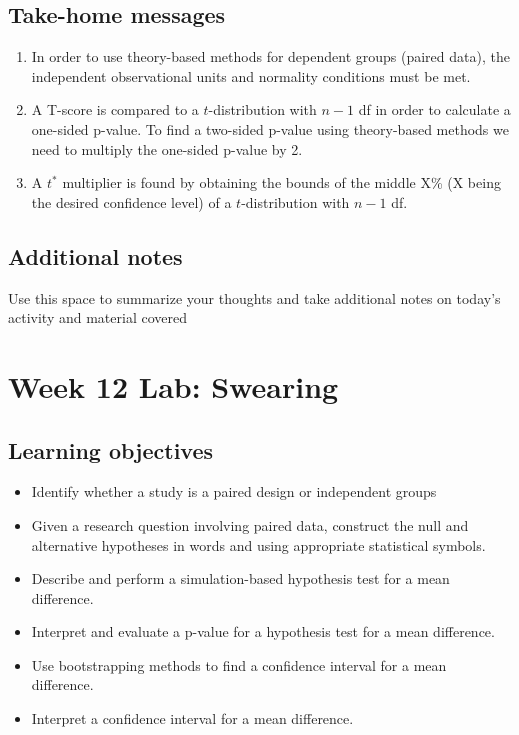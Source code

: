 \documentclass[
]{report}
\begin{document}
\hypertarget{take-home-messages-19}{%
\subsection{Take-home messages}\label{take-home-messages-19}}

\begin{enumerate}
\def\labelenumi{\arabic{enumi}.}
\item
  In order to use theory-based methods for dependent groups (paired data), the independent observational units and normality conditions must be met.
\item
  A T-score is compared to a \(t\)-distribution with \(n - 1\) df in order to calculate a one-sided p-value. To find a two-sided p-value using theory-based methods we need to multiply the one-sided p-value by 2.
\item
  A \(t^*\) multiplier is found by obtaining the bounds of the middle X\% (X being the desired confidence level) of a \(t\)-distribution with \(n - 1\) df.
\end{enumerate}

\hypertarget{additional-notes-19}{%
\subsection{Additional notes}\label{additional-notes-19}}

Use this space to summarize your thoughts and take additional notes on today's activity and material covered

\newpage

\hypertarget{week-12-lab-swearing}{%
\section{Week 12 Lab: Swearing}\label{week-12-lab-swearing}}


\hypertarget{learning-objectives-18}{%
\subsection{Learning objectives}\label{learning-objectives-18}}

\begin{itemize}
\item
  Identify whether a study is a paired design or independent groups
\item
  Given a research question involving paired data, construct the null and alternative hypotheses
  in words and using appropriate statistical symbols.
\item
  Describe and perform a simulation-based hypothesis test for a mean difference.
\item
  Interpret and evaluate a p-value for a hypothesis test for a mean difference.
\item
  Use bootstrapping methods to find a confidence interval for a mean difference.
\item
  Interpret a confidence interval for a mean difference.
\end{itemize}
\end{document}
